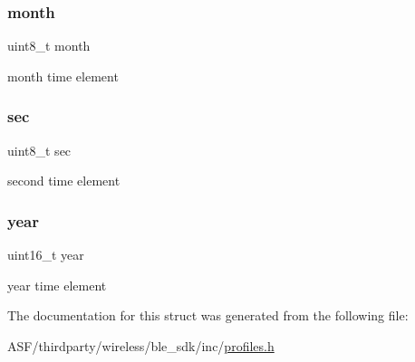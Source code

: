 \subsubsection{\texorpdfstring{month}{month}}
{\footnotesize\ttfamily uint8\+\_\+t month}



month time element 

\mbox{\label{structprf__date__time_ad1696900026b287a87c563b733a21bc3}} 
\subsubsection{\texorpdfstring{sec}{sec}}
{\footnotesize\ttfamily uint8\+\_\+t sec}



second time element 

\mbox{\label{structprf__date__time_a57ca98d8f6d4baf0fe41c583c7dcb0d5}} 
\subsubsection{\texorpdfstring{year}{year}}
{\footnotesize\ttfamily uint16\+\_\+t year}



year time element 



The documentation for this struct was generated from the following file\+:\begin{DoxyCompactItemize}
\item 
A\+S\+F/thirdparty/wireless/ble\+\_\+sdk/inc/\mbox{\hyperlink{profiles_8h}{profiles.\+h}}\end{DoxyCompactItemize}
